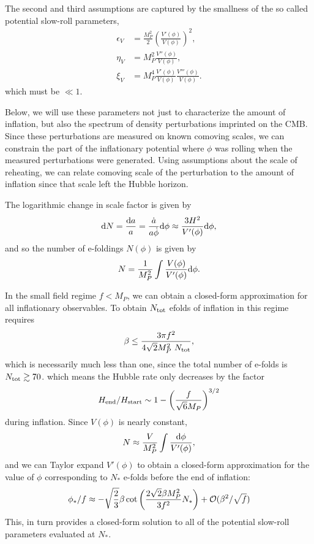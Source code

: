 \documentclass[aps,amsfonts,amsmath,prd,preprint,nofootinbib,superscriptaddress]{revtex4}
\newcommand{\Mp}{{M_{P}}}
\newcommand{\MMp}{{M_P^2}}
\newcommand{\rmd}{{\rm d}}
\begin{document}
The second and third assumptions are captured by the smallness of the so called potential slow-roll parameters,
\begin{align}
\epsilon_V &= \frac{\MMp}{2}\left(\frac{V'(\phi)}{V(\phi)}\right)^2,\\
\eta_V &=  \MMp \frac{V''(\phi)}{V(\phi)},\\
\xi_V &= M^4_{P} \frac{V'(\phi)}{V(\phi)}\frac{V'''(\phi)}{V(\phi)}.
\end{align}
which must be $\ll 1$.

Below, we will use these parameters not just to characterize the amount of inflation, but also the spectrum
of density perturbations imprinted on the CMB.  Since these perturbations are measured on known comoving scales, we
can constrain the part of the inflationary potential where $\phi$ was rolling when the measured perturbations were generated.  Using assumptions about the
scale of reheating, we can relate comoving scale of the perturbation to the amount of inflation since that scale left the Hubble horizon.


The logarithmic change in scale factor is given by
\begin{align}
\rmd N = \frac{\rmd a}{a} = \frac{\dot a}{a\dot\phi}\rmd\phi \approx \frac{3H^2}{V'(\phi)}\rmd\phi,
\end{align}
and so the number of e-foldings $N(\phi)$ is given by
\begin{align}
N = \frac{1}{\MMp}\int \frac{V(\phi)}{V'(\phi)}\rmd\phi.
\end{align}





In the small field regime  $f < \Mp$, we can obtain a closed-form approximation for all inflationary observables.  To obtain $N_{\rm tot}$ efolds of inflation in this regime requires
\begin{align}
 \beta \leq \frac{3\pi f^2}{4\sqrt{2}\MMp~N_{\rm tot}}, 
 \end{align}
which is necessarily much less than one, since the total number of e-folds is $N_{\rm tot} \gtrsim 70$. 
which means the Hubble rate only decreases by the factor
\begin{align}
H_{\rm end}/H_{\rm start} \sim 1-\left(\frac{f}{\sqrt{6}\Mp}\right)^{3/2}
\end{align}
during inflation.  
Since $V(\phi)$ is nearly constant, 
\begin{align}
N \approx \frac{V}{\MMp}\int\frac{\rmd\phi}{V'(\phi)},
\end{align}
and we can Taylor expand $V'(\phi)$ to obtain a closed-form approximation for the value of $\phi$ corresponding to $N_\ast$ e-folds before the end of inflation:
\begin{align}
\phi_\ast/f \approx -\sqrt{\frac{2}{3}}\beta \cot\left(\frac{2\sqrt{2}\beta\MMp}{3f^2}N_\ast\right) + {\cal O}(\beta^2/\sqrt{f})
\end{align}  
This, in turn provides a closed-form solution to all of the potential slow-roll parameters
evaluated at $N_\ast$.
\end{document}
